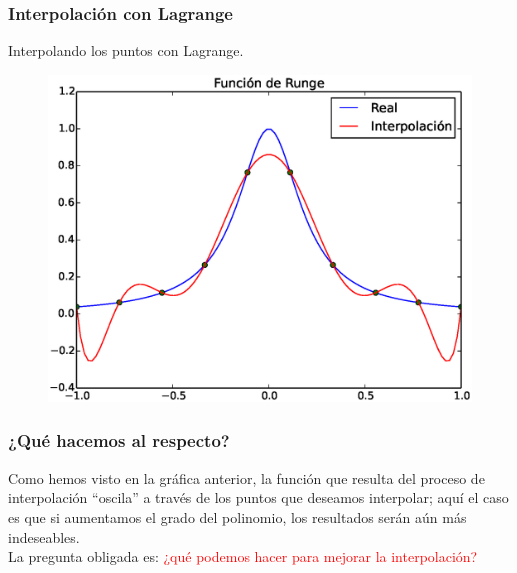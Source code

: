 {\begin{frame}
\begin{figure}
\end{figure}
\end{frame}
\begin{frame}
\frametitle{Interpolación con Lagrange}
Interpolando los puntos con Lagrange.
\begin{figure}
    \centering
    \includegraphics[scale=0.5]{Imagenes/Funcion_Runge_03.eps} 
\end{figure}
\end{frame}
\begin{frame}
\frametitle{¿Qué hacemos al respecto?}
Como hemos visto en la gráfica anterior, la función que resulta del proceso de interpolación \enquote{oscila} a través de los puntos que deseamos interpolar; aquí el caso es que si aumentamos el grado del polinomio, los resultados serán aún más indeseables.
\\
\medskip
\pause
La pregunta obligada es: \textcolor{red}{¿qué podemos hacer para mejorar la interpolación?}
\end{frame}
}
